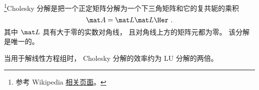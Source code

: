 
\begin{issues}
\issueDraft
\end{issues}


\footnote{参考 Wikipedia \href{https://en.wikipedia.org/wiki/Cholesky_decomposition}{相关页面}。}Cholesky 分解是把一个正定矩阵分解为一个下三角矩阵和它的复共轭的乘积
\begin{equation}
\mat A = \mat L \mat L\Her~.
\end{equation}
其中 $\mat L$ 具有大于零的实数对角线， 且对角线上方的矩阵元都为零。 该分解是唯一的。

当用于解线性方程组时， Cholesky 分解的效率约为 LU 分解的两倍。 %
